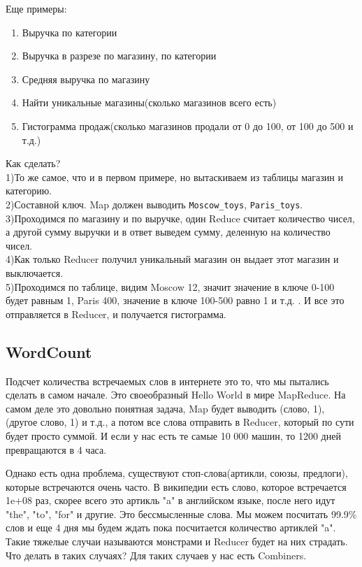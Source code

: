\documentclass{article}
\begin{document}
Еще примеры:
\begin{enumerate}
    \item Выручка по категории
    \item Выручка в разрезе по магазину, по категории
    \item Средняя выручка по магазину
    \item Найти уникальные магазины(сколько магазинов всего есть)
    \item Гистограмма продаж(сколько магазинов продали от 0 до 100, от 100 до 500 и т.д.)
\end{enumerate}



\noindent Как сделать?\\
1)То же самое, что и в первом примере, но вытаскиваем из таблицы магазин и категорию.\\
2)Составной ключ. Map должен выводить \texttt{Moscow\_toys}, \texttt{Paris\_toys}.\\
3)Проходимся по магазину и по выручке, один Reduce считает количество чисел, а другой сумму выручки и в ответ выведем сумму, деленную на количество чисел.\\
4)Как только Reducer получил уникальный магазин он выдает этот магазин и выключается.\\
5)Проходимся по таблице, видим Moscow 12, значит значение в ключе 0-100 будет равным 1, Paris 400, значение в ключе 100-500 равно 1 и т.д. . И все это отправляется в Reducer, и получается гистограмма.

\subsection{WordCount}

Подсчет количества встречаемых слов в интернете это то, что мы пытались сделать в самом начале. Это своеобразный Hello World в мире MapReduce. На самом деле это довольно понятная задача, Map будет выводить (слово, 1), (другое слово, 1) и т.д., а потом все слова отправить в Reducer, который по сути будет просто суммой. И если у нас есть те самые 10 000 машин, то 1200 дней превращаются в 4 часа.

Однако есть одна проблема, существуют стоп-слова(артикли, союзы, предлоги), которые встречаются очень часто. В википедии есть слово, которое встречается 1e+08 раз, скорее всего это артикль "a" в английском языке, после него идут "the", "to", "for" и другие. Это бессмысленные слова. Мы можем посчитать 99.9\% слов и еще 4 дня мы будем ждать пока посчитается количество артиклей "a". Такие тяжелые случаи называются монстрами и Reducer будет на них страдать. Что делать в таких случаях? Для таких случаев у нас есть Combiners.
\end{document}
